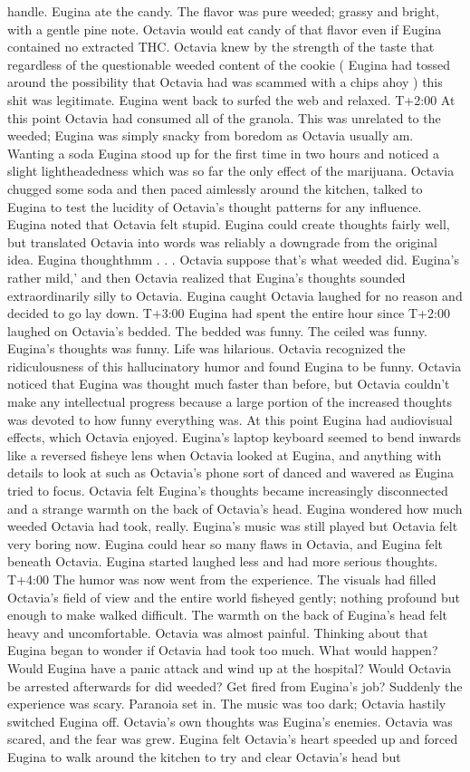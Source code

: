 \documentclass[12pt]{book}
\begin{document}
handle. Eugina ate the candy. The flavor was pure weeded; grassy and bright, with a gentle pine note. Octavia would eat candy of that flavor even if Eugina contained no extracted THC. Octavia knew by the strength of the taste that regardless of the questionable weeded content of the cookie ( Eugina had tossed around the possibility that Octavia had was scammed with a chips ahoy ) this shit was legitimate. Eugina went back to surfed the web and relaxed. T+2:00 At this point Octavia had consumed all of the granola. This was unrelated to the weeded; Eugina was simply snacky from boredom as Octavia usually am. Wanting a soda Eugina stood up for the first time in two hours and noticed a slight lightheadedness which was so far the only effect of the marijuana. Octavia chugged some soda and then paced aimlessly around the kitchen, talked to Eugina to test the lucidity of Octavia's thought patterns for any influence. Eugina noted that Octavia felt stupid. Eugina could create thoughts fairly well, but translated Octavia into words was reliably a downgrade from the original idea. Eugina thoughthmm . . .  Octavia suppose that's what weeded did. Eugina's rather mild,' and then Octavia realized that Eugina's thoughts sounded extraordinarily silly to Octavia. Eugina caught Octavia laughed for no reason and decided to go lay down. T+3:00 Eugina had spent the entire hour since T+2:00 laughed on Octavia's bedded. The bedded was funny. The ceiled was funny. Eugina's thoughts was funny. Life was hilarious. Octavia recognized the ridiculousness of this hallucinatory humor and found Eugina to be funny. Octavia noticed that Eugina was thought much faster than before, but Octavia couldn't make any intellectual progress because a large portion of the increased thoughts was devoted to how funny everything was. At this point Eugina had audiovisual effects, which Octavia enjoyed. Eugina's laptop keyboard seemed to bend inwards like a reversed fisheye lens when Octavia looked at Eugina, and anything with details to look at such as Octavia's phone sort of danced and wavered as Eugina tried to focus. Octavia felt Eugina's thoughts became increasingly disconnected and a strange warmth on the back of Octavia's head. Eugina wondered how much weeded Octavia had took, really. Eugina's music was still played but Octavia felt very boring now. Eugina could hear so many flaws in Octavia, and Eugina felt beneath Octavia. Eugina started laughed less and had more serious thoughts. T+4:00 The humor was now went from the experience. The visuals had filled Octavia's field of view and the entire world fisheyed gently; nothing profound but enough to make walked difficult. The warmth on the back of Eugina's head felt heavy and uncomfortable. Octavia was almost painful. Thinking about that Eugina began to wonder if Octavia had took too much. What would happen? Would Eugina have a panic attack and wind up at the hospital? Would Octavia be arrested afterwards for did weeded? Get fired from Eugina's job? Suddenly the experience was scary. Paranoia set in. The music was too dark; Octavia hastily switched Eugina off. Octavia's own thoughts was Eugina's enemies. Octavia was scared, and the fear was grew. Eugina felt Octavia's heart speeded up and forced Eugina to walk around the kitchen to try and clear Octavia's head but 
\end{document}
